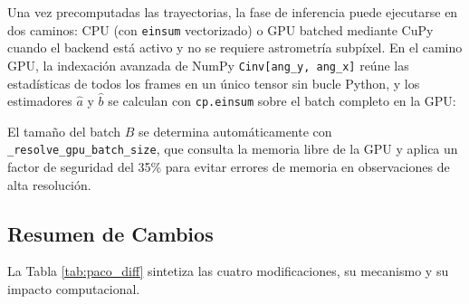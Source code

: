 Una vez precomputadas las trayectorias, la fase de inferencia puede ejecutarse en dos caminos: CPU (con \texttt{einsum} vectorizado) o GPU batched mediante CuPy cuando el backend está activo y no se requiere astrometría subpíxel. En el camino GPU, la indexación avanzada de NumPy \texttt{Cinv[ang\_y, ang\_x]} reúne las estadísticas de todos los frames en un único tensor sin bucle Python, y los estimadores $\hat{a}$ y $\hat{b}$ se calculan con \texttt{cp.einsum} sobre el batch completo en la GPU:

\begin{algorithm}[H]
\caption{FastPACO -- camino GPU batched (versión extendida)}
\label{alg:fastpaco_gpu}
\end{algorithm}

El tamaño del batch $B$ se determina automáticamente con \texttt{\_resolve\_gpu\_batch\_size}, que consulta la memoria libre de la GPU y aplica un factor de seguridad del 35\% para evitar errores de memoria en observaciones de alta resolución.

\subsection{Resumen de Cambios}

La Tabla \ref{tab:paco_diff} sintetiza las cuatro modificaciones, su mecanismo y su impacto computacional.

